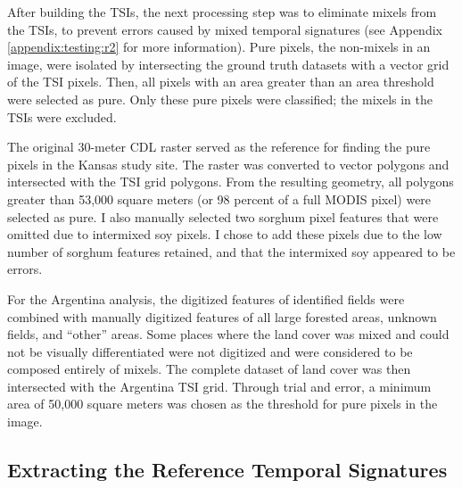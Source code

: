 After building the TSIs, the next processing step was to eliminate mixels from the TSIs, to prevent errors caused by mixed temporal signatures (see Appendix \ref{appendix:testing:r2} for more information). Pure pixels, the non-mixels in an image, were isolated by intersecting the ground truth datasets with a vector grid of the TSI pixels. Then, all pixels with an area greater than an area threshold were selected as pure. Only these pure pixels were classified; the mixels in the TSIs were excluded.

The original 30-meter CDL raster served as the reference for finding the pure pixels in the Kansas study site. The raster was converted to vector polygons and intersected with the TSI grid polygons. From the resulting geometry, all polygons greater than 53,000 square meters (or 98 percent of a full MODIS pixel) were selected as pure. I also manually selected two sorghum pixel features that were omitted due to intermixed soy pixels. I chose to add these pixels due to the low number of sorghum features retained, and that the intermixed soy appeared to be errors.

For the Argentina analysis, the digitized features of identified fields were combined with manually digitized features of all large forested areas, unknown fields, and ``other'' areas. Some places where the land cover was mixed and could not be visually differentiated were not digitized and were considered to be composed entirely of mixels. The complete dataset of land cover was then intersected with the Argentina TSI grid. Through trial and error, a minimum area of 50,000 square meters was chosen as the threshold for pure pixels in the image.

\subsection{Extracting the Reference Temporal Signatures}

